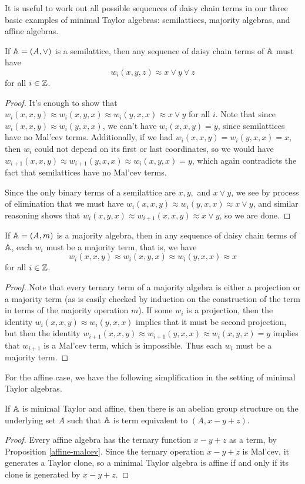 \documentclass[letterpaper,11pt]{article}
\begin{document}
It is useful to work out all possible sequences of daisy chain terms in our three basic examples of minimal Taylor algebras: semilattices, majority algebras, and affine algebras.

\begin{prop} If $\mathbb{A} = (A,\vee)$ is a semilattice, then any sequence of daisy chain terms of $\mathbb{A}$ must have
\[
w_i(x,y,z) \approx x \vee y \vee z
\]
for all $i \in \mathbb{Z}$.
\end{prop}
\begin{proof} It's enough to show that $w_i(x,x,y) \approx w_i(x,y,x) \approx w_i(y,x,x) \approx x \vee y$ for all $i$. Note that since $w_i(x,x,y) \approx w_i(y,x,x)$, we can't have $w_i(x,x,y) = y$, since semilattices have no Mal'cev terms. Additionally, if we had $w_i(x,x,y) = w_i(y,x,x) = x$, then $w_i$ could not depend on its first or last coordinates, so we would have $w_{i+1}(x,x,y) \approx w_{i+1}(y,x,x) \approx w_i(x,y,x) = y$, which again contradicts the fact that semilattices have no Mal'cev terms.

Since the only binary terms of a semilattice are $x, y,$ and $x \vee y$, we see by process of elimination that we must have $w_i(x,x,y) \approx w_i(y,x,x) \approx x \vee y$, and similar reasoning shows that $w_i(x,y,x) \approx w_{i+1}(x,x,y) \approx x \vee y$, so we are done.
\end{proof}

\begin{prop} If $\mathbb{A} = (A,m)$ is a majority algebra, then in any sequence of daisy chain terms of $\mathbb{A}$, each $w_i$ must be a majority term, that is, we have
\[
w_i(x,x,y) \approx w_i(x,y,x) \approx w_i(y,x,x) \approx x
\]
for all $i \in \mathbb{Z}$.
\end{prop}
\begin{proof} Note that every ternary term of a majority algebra is either a projection or a majority term (as is easily checked by induction on the construction of the term in terms of the majority operation $m$). If some $w_i$ is a projection, then the identity $w_i(x,x,y) \approx w_i(y,x,x)$ implies that it must be second projection, but then the identity $w_{i+1}(x,x,y) \approx w_{i+1}(y,x,x) \approx w_i(x,y,x) = y$ implies that $w_{i+1}$ is a Mal'cev term, which is impossible. Thus each $w_i$ must be a majority term.
\end{proof}

For the affine case, we have the following simplification in the setting of minimal Taylor algebras.

\begin{prop} If $\mathbb{A}$ is minimal Taylor and affine, then there is an abelian group structure on the underlying set $A$ such that $\mathbb{A}$ is term equivalent to $(A,x-y+z)$.
\end{prop}
\begin{proof} Every affine algebra has the ternary function $x - y + z$ as a term, by Proposition \ref{affine-malcev}. Since the ternary operation $x-y+z$ is Mal'cev, it generates a Taylor clone, so a minimal Taylor algebra is affine if and only if its clone is generated by $x-y+z$.
\end{proof}
\end{document}

